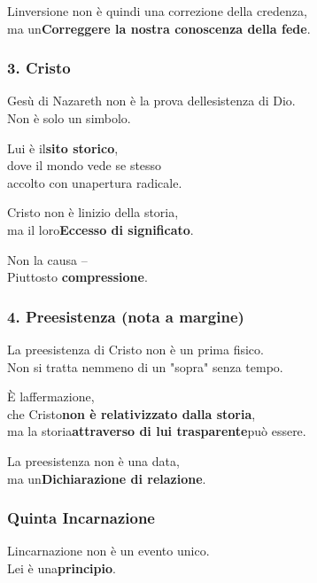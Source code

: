 \documentclass[
]{article}
\begin{document}
L\textquotesingle inversione non è quindi una correzione della credenza,\\
ma un\textbf{Correggere la nostra conoscenza della fede}.

\subsubsection{\texorpdfstring{\textbf{3. Cristo}}{3. Cristo}}\label{cristo}

Gesù di Nazareth non è la prova dell\textquotesingle esistenza di Dio.\\
Non è solo un simbolo.

Lui è il\textbf{sito storico},\\
dove il mondo vede se stesso\\
accolto con un\textquotesingle apertura radicale.

Cristo non è l\textquotesingle inizio della storia,\\
ma il loro\textbf{Eccesso di significato}.

Non la causa --\\
Piuttosto \textbf{compressione}.

\subsubsection{\texorpdfstring{\textbf{4. Preesistenza (nota a margine)}}{4. Preesistenza (nota a margine)}}\label{preesistenza-nota-a-margine}

La preesistenza di Cristo non è un prima fisico.\\
Non si tratta nemmeno di un "sopra" senza tempo.

È l\textquotesingle affermazione,\\
che Cristo\textbf{non è relativizzato dalla storia},\\
ma la storia\textbf{attraverso di lui trasparente}può essere.

La preesistenza non è una data,\\
ma un\textbf{Dichiarazione di relazione}.

\subsubsection{\texorpdfstring{\textbf{Quinta Incarnazione}}{Quinta Incarnazione}}\label{quinta-incarnazione}

L\textquotesingle incarnazione non è un evento unico.\\
Lei è una\textbf{principio}.
\end{document}

